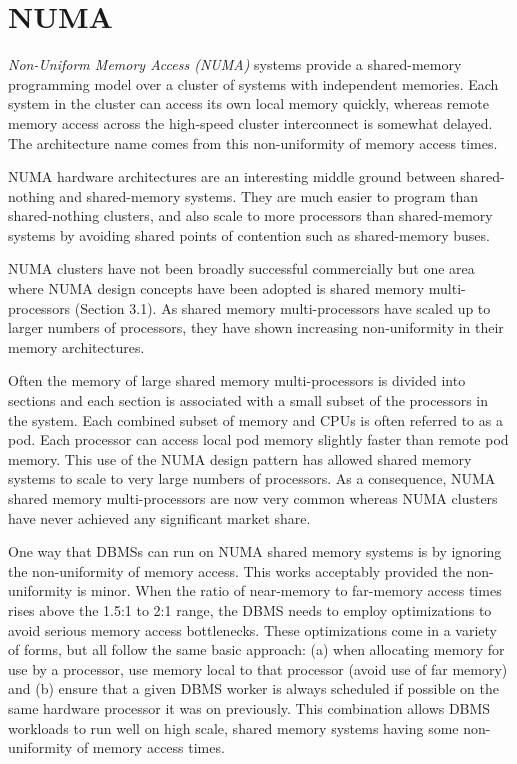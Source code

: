 \documentclass[a4paper,11pt,twoside,openright]{book}
\begin{document}
\hypertarget{numa}{%
\section{NUMA}\label{numa}}

\emph{Non-Uniform Memory Access (NUMA)} systems provide a shared-memory
programming model over a cluster of systems with independent memories.
Each system in the cluster can access its own local memory quickly,
whereas remote memory access across the high-speed cluster interconnect
is somewhat delayed. The architecture name comes from this
non-uniformity of memory access times.

NUMA hardware architectures are an interesting middle ground between
shared-nothing and shared-memory systems. They are much easier to
program than shared-nothing clusters, and also scale to more processors
than shared-memory systems by avoiding shared points of contention such
as shared-memory buses.

NUMA clusters have not been broadly successful commercially but one area
where NUMA design concepts have been adopted is shared memory
multi-processors (Section 3.1). As shared memory multi-processors have
scaled up to larger numbers of processors, they have shown increasing
non-uniformity in their memory architectures.

Often the memory of large shared memory multi-processors is divided into
sections and each section is associated with a small subset of the
processors in the system. Each combined subset of memory and CPUs is
often referred to as a pod. Each processor can access local pod memory
slightly faster than remote pod memory. This use of the NUMA design
pattern has allowed shared memory systems to scale to very large numbers
of processors. As a consequence, NUMA shared memory multi-processors are
now very common whereas NUMA clusters have never achieved any
significant market share.

One way that DBMSs can run on NUMA shared memory systems is by ignoring
the non-uniformity of memory access. This works acceptably provided the
non-uniformity is minor. When the ratio of near-memory to far-memory
access times rises above the 1.5:1 to 2:1 range, the DBMS needs to
employ optimizations to avoid serious memory access bottlenecks. These
optimizations come in a variety of forms, but all follow the same basic
approach: (a) when allocating memory for use by a processor, use memory
local to that processor (avoid use of far memory) and (b) ensure that a
given DBMS worker is always scheduled if possible on the same hardware
processor it was on previously. This combination allows DBMS workloads
to run well on high scale, shared memory systems having some
non-uniformity of memory access times.
\end{document}
